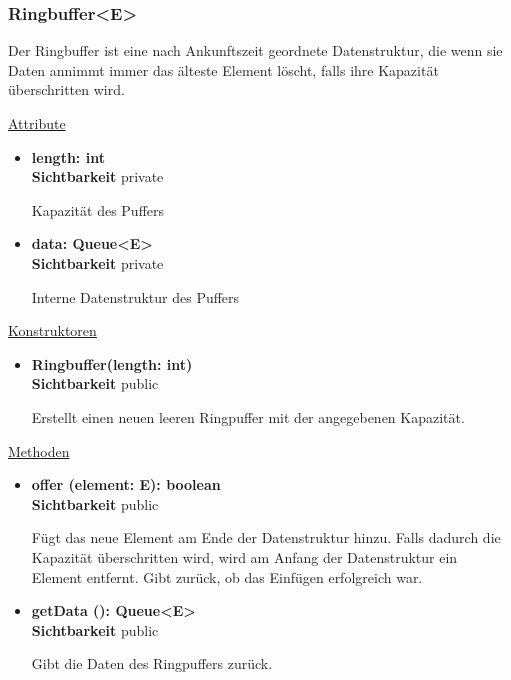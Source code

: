 \subsubsection{Ringbuffer<E>} \label{app:klasse:Ringbuffer}
Der Ringbuffer ist eine nach Ankunftszeit geordnete Datenstruktur, die wenn sie Daten annimmt immer das älteste Element löscht, falls ihre Kapazität überschritten wird. \newline

\underline{Attribute}
\begin{itemize}
\itemsep0pt
\item \textbf{length: int} \hfill\\ 
\textbf{Sichtbarkeit} private

Kapazität des Puffers

\item \textbf{data: Queue<E>} \hfill\\ 
\textbf{Sichtbarkeit} private

Interne Datenstruktur des Puffers
\end{itemize}

\underline{Konstruktoren}
\begin{itemize}
\itemsep0pt
\item \textbf{Ringbuffer(length: int)} \hfill\\
\textbf{Sichtbarkeit} public

Erstellt einen neuen leeren Ringpuffer mit der angegebenen Kapazität.
\end{itemize}

\underline{Methoden}
\begin{itemize}
\itemsep0pt
\item \textbf{offer (element: E): boolean}\hfill\\
\textbf{Sichtbarkeit} public

Fügt das neue Element am Ende der Datenstruktur hinzu. Falls dadurch die Kapazität überschritten wird, wird am Anfang der Datenstruktur ein Element entfernt. Gibt zurück, ob das Einfügen erfolgreich war.

\item \textbf{getData (): Queue<E>}\hfill\\
\textbf{Sichtbarkeit} public

Gibt die Daten des Ringpuffers zurück.

\end{itemize}